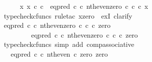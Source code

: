 \begin{isabellebody}
\ \ \ \ \isamarkupfalse%
\ {\isachardoublequoteopen}{\isasymexists}x{\isachardot}{\kern0pt}\ x\ {\isasymin}\isactrlsub c\ {\isasymnat}\isactrlsub c\ {\isasymand}\ {\isacharparenleft}{\kern0pt}eq{\isacharunderscore}{\kern0pt}pred\ {\isasymnat}\isactrlsub c\ {\isasymcirc}\isactrlsub c\ {\isasymlangle}nth{\isacharunderscore}{\kern0pt}even{\isacharcomma}{\kern0pt}zero\ {\isasymcirc}\isactrlsub c\ {\isasymbeta}\isactrlbsub {\isasymnat}\isactrlsub c\isactrlesub {\isasymrangle}{\isacharparenright}{\kern0pt}\ {\isasymcirc}\isactrlsub c\ x\ {\isacharequal}{\kern0pt}\ {\isasymt}{\isachardoublequoteclose}\isanewline
\ \ \ \ \isamarkupfalse%
\ {\isacharparenleft}{\kern0pt}typecheck{\isacharunderscore}{\kern0pt}cfuncs{\isacharcomma}{\kern0pt}\ rule{\isacharunderscore}{\kern0pt}tac\ x{\isacharequal}{\kern0pt}{\isachardoublequoteopen}zero{\isachardoublequoteclose}\ \ exI{\isacharcomma}{\kern0pt}\ clarify{\isacharparenright}{\kern0pt}\isanewline
\ \ \ \ \ \ \isamarkupfalse%
\ {\isachardoublequoteopen}{\isacharparenleft}{\kern0pt}eq{\isacharunderscore}{\kern0pt}pred\ {\isasymnat}\isactrlsub c\ {\isasymcirc}\isactrlsub c\ {\isasymlangle}nth{\isacharunderscore}{\kern0pt}even{\isacharcomma}{\kern0pt}zero\ {\isasymcirc}\isactrlsub c\ {\isasymbeta}\isactrlbsub {\isasymnat}\isactrlsub c\isactrlesub {\isasymrangle}{\isacharparenright}{\kern0pt}\ {\isasymcirc}\isactrlsub c\ zero\isanewline
\ \ \ \ \ \ \ \ {\isacharequal}{\kern0pt}\ eq{\isacharunderscore}{\kern0pt}pred\ {\isasymnat}\isactrlsub c\ {\isasymcirc}\isactrlsub c\ {\isasymlangle}nth{\isacharunderscore}{\kern0pt}even{\isacharcomma}{\kern0pt}zero\ {\isasymcirc}\isactrlsub c\ {\isasymbeta}\isactrlbsub {\isasymnat}\isactrlsub c\isactrlesub {\isasymrangle}\ {\isasymcirc}\isactrlsub c\ zero{\isachardoublequoteclose}\isanewline
\ \ \ \ \ \ \ \ \isamarkupfalse%
\ {\isacharparenleft}{\kern0pt}typecheck{\isacharunderscore}{\kern0pt}cfuncs{\isacharcomma}{\kern0pt}\ simp\ add{\isacharcolon}{\kern0pt}\ comp{\isacharunderscore}{\kern0pt}associative{}{\isacharparenright}{\kern0pt}\isanewline
\ \ \ \ \ \ \isamarkupfalse%
\ \isamarkupfalse%
\ {\isachardoublequoteopen}{\isachardot}{\kern0pt}{\isachardot}{\kern0pt}{\isachardot}{\kern0pt}\ {\isacharequal}{\kern0pt}\ eq{\isacharunderscore}{\kern0pt}pred\ {\isasymnat}\isactrlsub c\ {\isasymcirc}\isactrlsub c\ {\isasymlangle}nth{\isacharunderscore}{\kern0pt}even\ {\isasymcirc}\isactrlsub c\ zero{\isacharcomma}{\kern0pt}\ zero{\isasymrangle}{\isachardoublequoteclose}\isanewline

\end{isabellebody}
